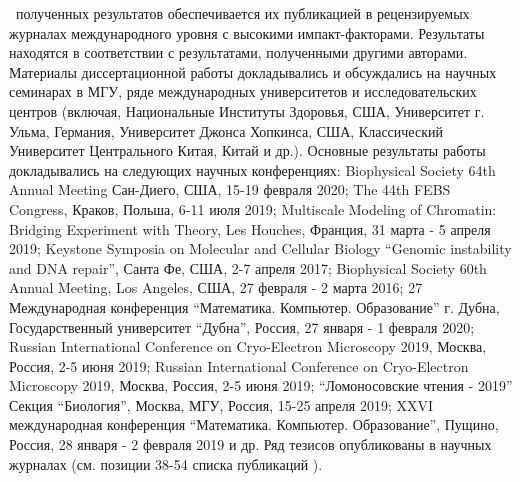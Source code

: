 \reliability\ полученных результатов обеспечивается их публикацией в рецензируемых журналах международного уровня с высокими импакт-факторами. Результаты находятся в соответствии с результатами, полученными другими авторами. Материалы диссертационной работы докладывались и обсуждались на научных семинарах в МГУ, ряде международных университетов и исследовательских центров (включая, Национальные Институты Здоровья, США, Университет г. Ульма, Германия, Университет Джонса Хопкинса, США, Классический Университет Центрального Китая, Китай и др.). 
Основные результаты работы докладывались на следующих научных конференциях:
Biophysical Society 64th Annual Meeting  Сан-Диего, США, 15-19 февраля 2020; The 44th FEBS Congress, Краков, Польша, 6-11 июля 2019; Multiscale Modeling of Chromatin: Bridging Experiment with Theory, Les Houches, Франция, 31 марта - 5 апреля 2019; Keystone Symposia on Molecular and Cellular Biology ``Genomic instability and DNA repair'', Санта Фе, США, 2-7 апреля 2017;  Biophysical Society 60th Annual Meeting, Los Angeles, США, 27 февраля - 2 марта 2016;
27 Международная конференция ``Математика. Компьютер. Образование'' г. Дубна, Государственный университет ``Дубна'', Россия, 27 января - 1 февраля 2020; Russian International Conference on Cryo-Electron Microscopy 2019, Москва, Россия, 2-5 июня 2019;
Russian International Conference on Cryo-Electron Microscopy 2019, Москва, Россия, 2-5 июня 2019;
``Ломоносовские чтения - 2019'' Секция ``Биология'', Москва, МГУ, Россия, 15-25 апреля 2019; XXVI международная конференция ``Математика. Компьютер. Образование'', Пущино, Россия, 28 января - 2 февраля 2019 и  др. \ifdefined\DISSER Ряд тезисов опубликованы в научных журналах (см. позиции 38-54 списка публикаций \cite{hada_histone_2019,bass_effect_2019,armeev_linking_2019,shaytan_structural_2018,gorkovets_joint_2018,xiao_molecular_2017,shaytan_hydroxyl-radical_2017,gribkova_investigation_2017,el_kennani_ms_histonedb_2017,chertkov_dual_2017,armeev_modeling_2016,armeev_nucleosome_2016,biswas_genomic_2016,draizen_histonedb_2016,lyubitelev_structure_2016,shaitan_dynamics_2016,shaytan_coupling_2016,shaytan_trajectories_2016,valieva_large-scale_2016,armeev_conformational_2015,armeev_molecular_2015,frank_direct_2015,gaykalova_structural_2015,goncearenco_structural_2015,shaytan_nucleosome_2015,bozdaganyan_comparative_2014,chang_analysis_2014,kasimova_voltage-gated_2014,nishi_physicochemical_2014,sokolova_genome_2014,yolamanova_peptide_2013,shaitan_influence_2013,orekhov_calculation_2012,shaytan_self-assembling_2011,shaytan_self-organizing_2011,%
greshnova_sinteticheskaya_2019,armeev_modelirovanie_2013,
          armeev_integrative_2020,kniazeva_analyzing_2020,armeev_analyzing_2019,gribkova_construction_2019,armeev_python_2019,gorkovets_mutual_2018,shaytan_microsecond_2017,shaytan_nucleosome_2016,shaytan_combined_2015,shaytan_polymorphism_2015,kasimova_investigation_2014,kasimova_molecular_2014,chang_pausing_2013,%
          armeev_abstract_2019,bass_abstract_2019,shaytan_water_2014,chang_structural_2013}). \fi
